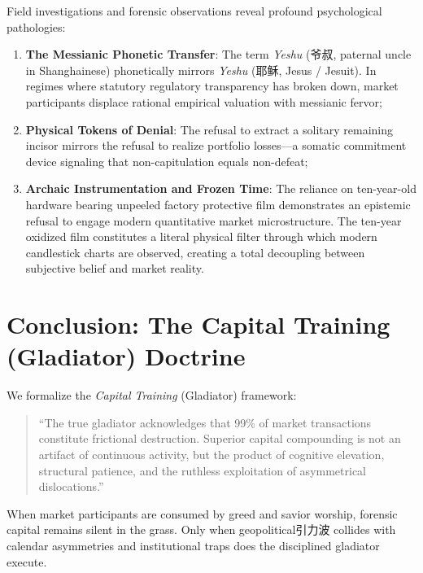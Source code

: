 \documentclass[11pt,a4paper]{article}
\begin{document}
Field investigations and forensic observations reveal profound psychological pathologies:
\begin{enumerate}
    \item \textbf{The Messianic Phonetic Transfer}: The term \textit{Yeshu} (爷叔, paternal uncle in Shanghainese) phonetically mirrors \textit{Yeshu} (耶稣, Jesus / Jesuit). In regimes where statutory regulatory transparency has broken down, market participants displace rational empirical valuation with messianic fervor;
    \item \textbf{Physical Tokens of Denial}: The refusal to extract a solitary remaining incisor mirrors the refusal to realize portfolio losses—a somatic commitment device signaling that non-capitulation equals non-defeat;
    \item \textbf{Archaic Instrumentation and Frozen Time}: The reliance on ten-year-old hardware bearing unpeeled factory protective film demonstrates an epistemic refusal to engage modern quantitative market microstructure. The ten-year oxidized film constitutes a literal physical filter through which modern candlestick charts are observed, creating a total decoupling between subjective belief and market reality.
\end{enumerate}

\section{Conclusion: The Capital Training (Gladiator) Doctrine}

We formalize the \textit{Capital Training} (Gladiator) framework:
\begin{quote}
``The true gladiator acknowledges that 99\% of market transactions constitute frictional destruction. Superior capital compounding is not an artifact of continuous activity, but the product of cognitive elevation, structural patience, and the ruthless exploitation of asymmetrical dislocations.''
\end{quote}

When market participants are consumed by greed and savior worship, forensic capital remains silent in the grass. Only when geopolitical引力波 collides with calendar asymmetries and institutional traps does the disciplined gladiator execute.



\end{document}
